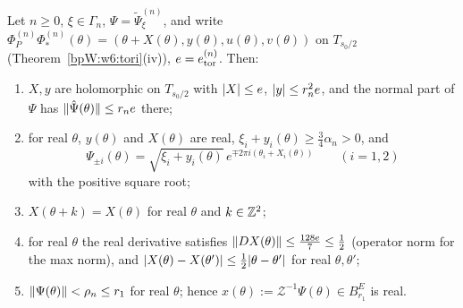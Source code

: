 \begin{lemma}\label{bpW:w8:torus-shape}
Let $n\ge0$, $\xi\in\Gamma_n$, $\Psi=\tilde\Psi^{(n)}_\xi$, and write $\Phi^{(n)}_P\Phi^{(n)}_*(\theta)=(\theta+X(\theta),y(\theta),u(\theta),v(\theta))$ on
$T_{s_0/2}$ (Theorem~\ref{bpW:w6:tori}(iv)), $e=e^{(n)}_{\rm tor}$. Then:
\begin{enumerate}[label=(\roman*)]
\item $X,y$ are holomorphic on $T_{s_0/2}$ with $\lvert X\rvert\le e$, $\lvert y\rvert\le r_n^2e$, and the normal part of $\Psi$ has
  $\lVert \hat\Psi(\theta)\rVert\le r_ne$ there;
\item for real $\theta$, $y(\theta)$ and $X(\theta)$ are real, $\xi_i+y_i(\theta)\ge\frac34\alpha_n>0$, and
  \[\Psi_{\pm i}(\theta)=\sqrt{\xi_i+y_i(\theta)}\,e^{\mp2\pi i(\theta_i+X_i(\theta))}\qquad(i=1,2)\]
  with the positive square root;
\item $X(\theta+k)=X(\theta)$ for real $\theta$ and $k\in\mathbb{Z}^2$;
\item for real $\theta$ the real derivative satisfies $\lVert DX(\theta)\rVert\le\frac{128e}7\le\frac12$ (operator norm for the max
  norm), and $\lvert X(\theta)-X(\theta')\rvert\le\frac12\lvert \theta-\theta'\rvert$ for real $\theta,\theta'$;
\item $\lVert \Psi(\theta)\rVert<\rho_n\le r_1$ for real $\theta$; hence $x(\theta):=\mathcal Z^{-1}\Psi(\theta)\in B^E_{r_1}$ is real.
\end{enumerate}
\end{lemma}
